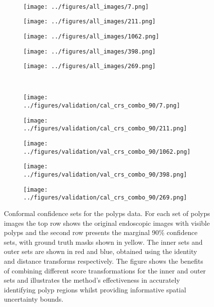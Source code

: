 \begin{figure}[h!]
	\\
		\begin{subfigure}{0.19\textwidth}
		\centering
		\texttt{[image: ../figures/all\_images/7.png]}
		\label{fig:1}
	\end{subfigure}
	\begin{subfigure}{0.19\textwidth}
		\centering
		\texttt{[image: ../figures/all\_images/211.png]}
		\label{fig:1}
	\end{subfigure}
	\begin{subfigure}{0.19\textwidth}
		\centering
		\texttt{[image: ../figures/all\_images/1062.png]}
		\label{fig:1}
	\end{subfigure}
	\begin{subfigure}{0.19\textwidth}
		\centering
		\texttt{[image: ../figures/all\_images/398.png]}
		\label{fig:1}
	\end{subfigure}
	\begin{subfigure}{0.19\textwidth}
		\centering
		\texttt{[image: ../figures/all\_images/269.png]}
		\label{fig:1}
	\end{subfigure}
	\vspace{-0.35cm}
	\\
	\begin{subfigure}{0.19\textwidth}
		\centering
		\texttt{[image: ../figures/validation/cal\_crs\_combo\_90/7.png]}
		\label{fig:1}
	\end{subfigure}
	\begin{subfigure}{0.19\textwidth}
		\centering
		\texttt{[image: ../figures/validation/cal\_crs\_combo\_90/211.png]}
		\label{fig:1}
	\end{subfigure}
	\begin{subfigure}{0.19\textwidth}
		\centering
		\texttt{[image: ../figures/validation/val\_crs\_combo\_90/1062.png]}
		\label{fig:1}
	\end{subfigure}
	\begin{subfigure}{0.19\textwidth}
		\centering
		\texttt{[image: ../figures/validation/val\_crs\_combo\_90/398.png]}
		\label{fig:1}
	\end{subfigure}
	\begin{subfigure}{0.19\textwidth}
		\centering
		\texttt{[image: ../figures/validation/cal\_crs\_combo\_90/269.png]}
		\label{fig:1}
	\end{subfigure}
	\label{fig:grid}
	\caption{Conformal confidence sets for the polyps data. For each set of polyps images the top row shows the original endoscopic images with visible polyps and the second row presents the marginal 90\% confidence sets, with ground truth masks shown in yellow. The inner sets and outer sets are shown in red and blue, obtained using the identity and distance transforms respectively. The figure shows the benefits of combining different score transformations for the inner and outer sets and illustrates the method's effectiveness in accurately identifying polyp regions whilst providing informative spatial uncertainty bounds.}\label{fig:res}
	\vspace{-0.5cm}
\end{figure}
